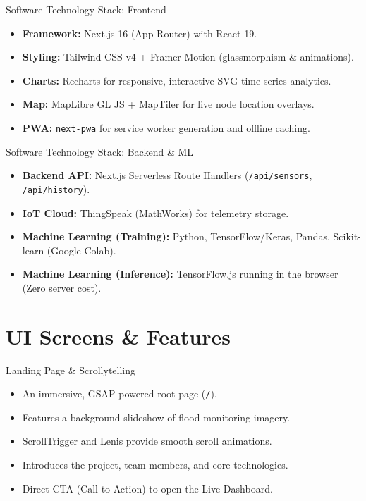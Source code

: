 \documentclass[aspectratio=169]{beamer}
\begin{document}
\begin{frame}{Software Technology Stack: Frontend}
  \begin{itemize}
    \item \textbf{Framework:} Next.js 16 (App Router) with React 19.
    \item \textbf{Styling:} Tailwind CSS v4 + Framer Motion (glassmorphism \& animations).
    \item \textbf{Charts:} Recharts for responsive, interactive SVG time-series analytics.
    \item \textbf{Map:} MapLibre GL JS + MapTiler for live node location overlays.
    \item \textbf{PWA:} \texttt{next-pwa} for service worker generation and offline caching.
  \end{itemize}
\end{frame}

\begin{frame}{Software Technology Stack: Backend \& ML}
  \begin{itemize}
    \item \textbf{Backend API:} Next.js Serverless Route Handlers (\texttt{/api/sensors}, \texttt{/api/history}).
    \item \textbf{IoT Cloud:} ThingSpeak (MathWorks) for telemetry storage.
    \item \textbf{Machine Learning (Training):} Python, TensorFlow/Keras, Pandas, Scikit-learn (Google Colab).
    \item \textbf{Machine Learning (Inference):} TensorFlow.js running in the browser (Zero server cost).
  \end{itemize}
\end{frame}

\section{UI Screens \& Features}

\begin{frame}{Landing Page \& Scrollytelling}
  \begin{itemize}
    \item An immersive, GSAP-powered root page (\texttt{/}).
    \item Features a background slideshow of flood monitoring imagery.
    \item ScrollTrigger and Lenis provide smooth scroll animations.
    \item Introduces the project, team members, and core technologies.
    \item Direct CTA (Call to Action) to open the Live Dashboard.
  \end{itemize}
\end{frame}
\end{document}

